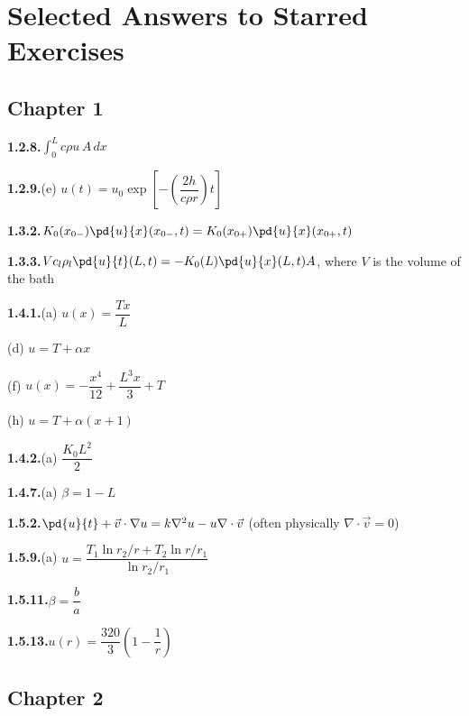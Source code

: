 
\chapter*{Selected Answers to Starred Exercises}

\section*{Chapter 1}

\textbf{1.2.8.}\quad $\displaystyle\int_0^L c\rho u\, A\, dx$

\medskip
\textbf{1.2.9.}\quad (e) $u(t) = u_0 \exp\!\left[-\left(\dfrac{2h}{c\rho r}\right)t\right]$

\medskip
\textbf{1.3.2.}\quad $K_0(x_{0-})\pd{u}{x}(x_{0-},t) = K_0(x_{0+})\pd{u}{x}(x_{0+},t)$

\medskip
\textbf{1.3.3.}\quad $Vc_l\rho_l\pd{u}{t}(L,t) = -K_0(L)\pd{u}{x}(L,t)A$, where $V$ is the volume of the bath

\medskip
\textbf{1.4.1.}\quad (a) $u(x) = \dfrac{Tx}{L}$

\quad (d) $u = T + \alpha x$

\quad (f) $u(x) = -\dfrac{x^4}{12} + \dfrac{L^3 x}{3} + T$

\quad (h) $u = T + \alpha(x+1)$

\medskip
\textbf{1.4.2.}\quad (a) $\dfrac{K_0 L^2}{2}$

\medskip
\textbf{1.4.7.}\quad (a) $\beta = 1 - L$

\medskip
\textbf{1.5.2.}\quad $\pd{u}{t} + \vec{v}\cdot\nabla u = k\nabla^2 u - u\nabla\cdot\vec{v}$ (often physically $\nabla\cdot\vec{v}=0$)

\medskip
\textbf{1.5.9.}\quad (a) $u = \dfrac{T_1\ln r_2/r + T_2\ln r/r_1}{\ln r_2/r_1}$

\medskip
\textbf{1.5.11.}\quad $\beta = \dfrac{b}{a}$

\medskip
\textbf{1.5.13.}\quad $u(r) = \dfrac{320}{3}\left(1 - \dfrac{1}{r}\right)$

\section*{Chapter 2}

